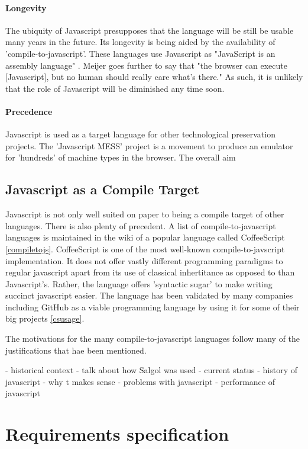 \documentclass{article}
\begin{document}
\paragraph{Longevity} The ubiquity of Javascript presupposes that the language will be still be usable many years in the future. Its longevity is being aided by the availability of 'compile-to-javascript'. These languages use Javascript as "JavaScript is an assembly language" \cite{hanselman}. Meijer goes further to say that "the browser can execute [Javascript], but no human should really care what’s there." As such, it is unlikely that the role of Javascript will be diminished any time soon.

\paragraph{Precedence} Javascript is used as a target language for other technological preservation projects. The 'Javascript MESS' project is a movement to produce an emulator for 'hundreds' of machine types in the browser. The overall aim 

\subsection{Javascript as a Compile Target}

Javascript is not only well suited on paper to being a compile target of other languages. There is also plenty of precedent. A list of compile-to-javascript languages is maintained in the wiki of a popular language called CoffeeScript \ref{compiletojs}. CoffeeScript is one of the most well-known compile-to-javscript implementation. It does not offer vastly different programming paradigms to regular javascript apart from its use of classical inhertitance as opposed to than Javascript's. Rather, the language offers 'syntactic sugar' to make writing succinct javascript easier. The language has been validated by many companies including GitHub as a viable programming language by using it for some of their big projects \ref{csusage}.

The motivations for the many compile-to-javascript languages follow many of the justifications that hae been mentioned.

- historical context
- talk about how Salgol was used
- current status
- history of javascript
- why t makes sense
- problems with javascript
- performance of javascript


\section{Requirements specification}
\end{document}
